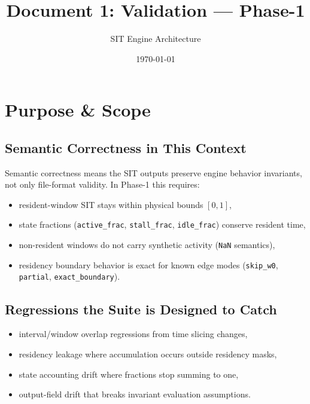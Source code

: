 \documentclass[11pt,a4paper]{article}
\title{Document 1: Validation --- Phase-1}
\author{SIT Engine Architecture}
\date{\today}
\begin{document}
\maketitle
\tableofcontents
\newpage

\section{Purpose \& Scope}
\subsection*{Semantic Correctness in This Context}
Semantic correctness means the SIT outputs preserve engine behavior invariants, not only file-format validity. In Phase-1 this requires:
\begin{itemize}[leftmargin=*]
  \item resident-window SIT stays within physical bounds \([0,1]\),
  \item state fractions (\texttt{active\_frac}, \texttt{stall\_frac}, \texttt{idle\_frac}) conserve resident time,
  \item non-resident windows do not carry synthetic activity (\texttt{NaN} semantics),
  \item residency boundary behavior is exact for known edge modes (\texttt{skip\_w0}, \texttt{partial}, \texttt{exact\_boundary}).
\end{itemize}

\subsection*{Regressions the Suite is Designed to Catch}
\begin{itemize}[leftmargin=*]
  \item interval/window overlap regressions from time slicing changes,
  \item residency leakage where accumulation occurs outside residency masks,
  \item state accounting drift where fractions stop summing to one,
  \item output-field drift that breaks invariant evaluation assumptions.
\end{itemize}
\end{document}
